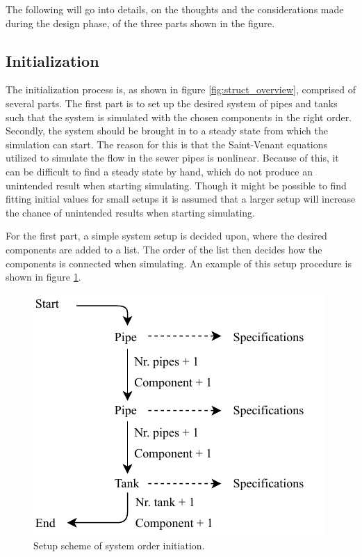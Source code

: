 
The following will go into details, on the thoughts and the considerations made during the design phase, of the three parts shown in the figure.

\subsection*{Initialization} 
The initialization process is, as shown in figure \ref{fig:struct_overview}, comprised of several parts. The first part is to set up the desired system of pipes and tanks such that the system is simulated with the chosen components in the right order.
Secondly, the system should be brought in to a steady state from which the simulation can start.
The reason for this is that the Saint-Venant equations utilized to simulate the flow in the sewer pipes is nonlinear. Because of this, it can be difficult to find a steady state by hand, which do not produce an unintended result when starting simulating. Though it might be possible to find fitting initial values for small setups it is assumed that a larger setup will increase the chance of unintended results when starting simulating.

For the first part, a simple system setup is decided upon, where the desired components are added to a list. The order of the list then decides how the components is connected when simulating. An example of this setup procedure is shown in figure \ref{fig:sys_setup}. 

\begin{figure}[H]
\centering
\includegraphics[width=0.5 \textwidth]{report/simulation/pictures/sys_setup.pdf}
\caption{Setup scheme of system order initiation.}
\label{fig:sys_setup}
\end{figure}

